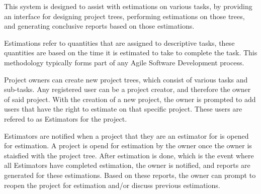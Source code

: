 This system is designed to assist with estimations on various tasks, by providing an interface for designing project trees, performing estimations on those trees, and generating conclusive reports based on those estimations.

Estimations refer to quantities that are assigned to descriptive tasks, these quantities are based on the time it is estimated to take to complete the task. This methodology typically forms part of any Agile Software Development process.

Project owners can create new project trees, which consist of various tasks and sub-tasks. Any registered user can be a project creator, and therefore the owner of said project. With the creation of a new project, the owner is prompted to add users that have the right to estimate on that specific project. These users are refered to as Estimators for the project.

Estimators are notified when a project that they are an estimator for is opened for estimation. A project is opend for estimation by the owner once the owner is staisfied with the project tree. After estimation is done, which is the event where all Estimators have completed estimation, the owner is notified, and reports are generated for these estimations. Based on these reports, the owner can prompt to reopen the project for estimation and/or discuss previous estimations.